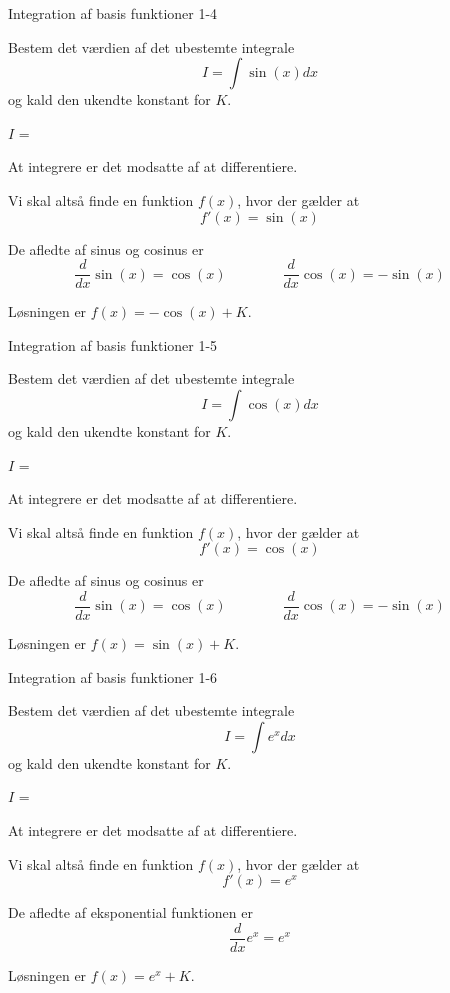 \documentclass{article}
\begin{document}
\begin{exercise}{Integration af basis funktioner 1-4}

Bestem det værdien af det ubestemte integrale
\[
I = \int \sin(x) dx
\]
og kald den ukendte konstant for $K$.

$I$ = 

\hint
At integrere er det modsatte af at differentiere.

\hint
Vi skal altså finde en funktion $f(x)$, hvor der gælder at
\[
f'(x) = \sin(x)
\]

\hint
De afledte af sinus og cosinus er
\[
\frac{d}{dx} \sin(x) = \cos(x)
\qquad \qquad
\frac{d}{dx} \cos(x) = - \sin(x)
\]


\hint
Løsningen er $f(x) = - \cos(x) + K$.

\end{exercise}


\begin{exercise}{Integration af basis funktioner 1-5}

Bestem det værdien af det ubestemte integrale
\[
I = \int \cos(x) dx
\]
og kald den ukendte konstant for $K$.

$I$ = 

\hint
At integrere er det modsatte af at differentiere.

\hint
Vi skal altså finde en funktion $f(x)$, hvor der gælder at
\[
f'(x) = \cos(x)
\]

\hint
De afledte af sinus og cosinus er
\[
\frac{d}{dx} \sin(x) = \cos(x)
\qquad \qquad
\frac{d}{dx} \cos(x) = - \sin(x)
\]


\hint
Løsningen er $f(x) = \sin(x) + K$.

\end{exercise}


\begin{exercise}{Integration af basis funktioner 1-6}

Bestem det værdien af det ubestemte integrale
\[
I = \int e^x dx
\]
og kald den ukendte konstant for $K$.

$I$ = 

\hint
At integrere er det modsatte af at differentiere.

\hint
Vi skal altså finde en funktion $f(x)$, hvor der gælder at
\[
f'(x) = e^x
\]

\hint
De afledte af eksponential funktionen er
\[
\frac{d}{dx} e^x = e^x
\]


\hint
Løsningen er $f(x) = e^x + K$.

\end{exercise}
\end{document}

